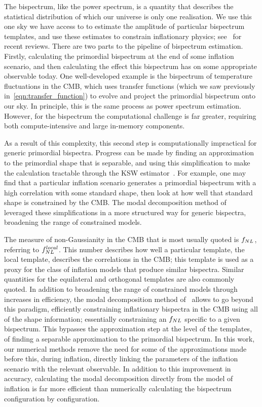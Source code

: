     The bispectrum, like the power spectrum, is a quantity that describes
the statistical distribution of which our universe is only one realisation.
We use this one sky we have access to to estimate the amplitude of
particular bispectrum templates,
and use these estimates to constrain inflationary physics; 
see~\cite{astro2020_features,astro2020_png} for recent reviews.
There are two parts to the pipeline of bispectrum estimation.
Firstly, calculating the primordial bispectrum at the end of some inflation scenario,
and then calculating the effect this bispectrum
has on some appropriate observable today.
One well-developed example is
the bispectrum of temperature fluctuations in the CMB, which uses transfer functions
(which we saw previously in~\eqref{eqn:transfer_function})
to evolve and project the primordial bispectrum onto our sky.
In principle, this is the same process as power spectrum estimation.
However, for the bispectrum the computational challenge is far greater,
requiring both compute-intensive and large in-memory components.


As a result of this complexity, this second step is computationally impractical for generic primordial bispectra.
Progress can be made by finding an approximation to the primordial shape
that is separable, and using this simplification
to make the calculation tractable
through the KSW estimator~\cite{Komatsu_2005, Munchmeyer_2014}.
For example, one may find that a particular inflation scenario generates
a primordial bispectrum with a high correlation with some standard shape,
then look at how well that standard shape is constrained by the CMB.
The modal decomposition method of~\cite{FergShell_1,FergShell_2,FergShell_3}
leveraged these simplifications in a more structured way
for generic bispectra, broadening the range of constrained models.


The measure of non-Gaussianity in the CMB that is
most usually quoted is $f_{NL}$, referring to $f^{local}_{NL}$.
This number describes how well a particular template, the local template,
describes the correlations in the CMB;
this template is used as a proxy for the class of inflation models that produce similar bispectra.
Similar quantities for the equilateral and orthogonal templates are also
commonly quoted.
In addition to broadening the range of constrained models through increases in efficiency,
the modal decomposition method of~\cite{FergShell_1,FergShell_2,FergShell_3}
allows to go beyond this paradigm, efficiently constraining inflationary bispectra in the CMB using
all of the shape information; essentially constraining an $f_{NL}$
specific to a given bispectrum. This bypasses the approximation step at the level of the templates,
of finding a separable approximation to the primordial bispectrum.
In this work, our numerical methods remove the need for some of the approximations
made before this, during inflation, directly linking the parameters of the inflation scenario
with the relevant observable.
In addition to this improvement in accuracy, calculating the modal decomposition
directly from the model of inflation is far more efficient 
than numerically calculating the bispectrum configuration by configuration.


